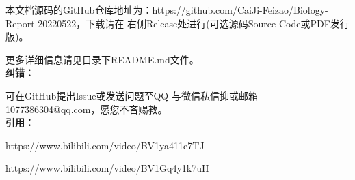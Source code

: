 \documentclass[UTF8,a4paper,11 pt]{ctexart}
\begin{document}
	本文档源码的GitHub仓库地址为：https://github.com/CaiJi-Feizao/Biology-Report-20220522，下载请在
	右侧Release处进行(可选源码Source Code或PDF发行版)。

	更多详细信息请见目录下README.md文件。
	\\\textbf{纠错：}
	
	可在GitHub提出Issue或发送问题至QQ
	与微信私信抑或邮箱1077386304@qq.com，愿您不吝赐教。
	\\\textbf{引用：}

	https://www.bilibili.com/video/BV1ya411e7TJ

	https://www.bilibili.com/video/BV1Gq4y1k7uH
\end{document}
